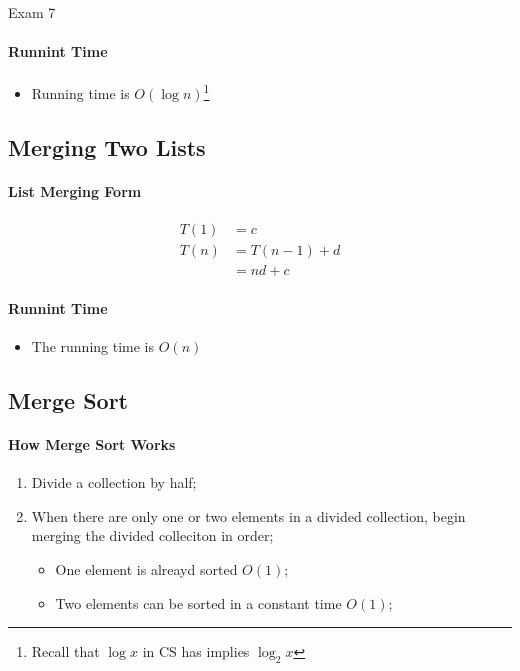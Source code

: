 \documentclass{note}
\begin{document}
\begin{note}{Exam 7}
    \paragraph{Runnint Time}
    \begin{itemize}
        \item Running time is $ O \left( \log n \right) $\footnote{Recall that $ \log x $ in CS has implies $ \log_{2} x $}
    \end{itemize}

    \subsection{Merging Two Lists}

    \paragraph{List Merging Form}
    \begin{align*}
        T(1) &= c \\
        T(n) &= T \left( n - 1 \right) + d \\
        &= nd + c
    \end{align*}

    \paragraph{Runnint Time}
    \begin{itemize}
        \item The running time is $ O \left( n \right) $ 
    \end{itemize}

    \subsection{Merge Sort}

    \paragraph{How Merge Sort Works}
    \begin{enumerate}
        \item Divide a collection by half;
        \item When there are only one or two elements in a divided collection, begin merging the divided colleciton in order;
        \begin{itemize}
            \item One element is alreayd sorted $ O (1) $;
            \item Two elements can be sorted in a constant time $ O (1) $;
        \end{itemize}
    \end{enumerate}


\end{note}
\end{document}
